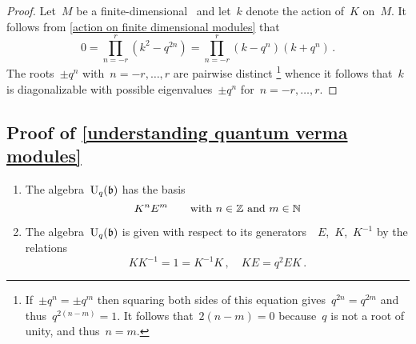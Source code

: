 \documentclass[a4paper, 11pt, oneside]{scrartcl}
\begin{document}
\begin{proof}
  Let~$M$ be a finite-dimensional~ and let~$k$ denote the action of~$K$ on~$M$.
  It follows from \cref{action on finite dimensional modules} that
  \[
    0
    =
    \prod_{n = -r}^r ( k^2 - q^{2n} )
    =
    \prod_{n = -r}^r ( k - q^n ) ( k + q^n ) \,.
  \]
  The roots~$\pm q^n$ with~$n = -r, \dotsc, r$ are pairwise distinct%
  \footnote{
    If~$\pm q^n = \pm q^m$ then squaring both sides of this equation gives~$q^{2n} = q^{2m}$ and thus~$q^{2(n-m)} = 1$.
    It follows that~$2(n-m) = 0$ because~$q$ is not a root of unity, and thus~$n = m$.
  }
  whence it follows that~$k$ is diagonalizable with possible eigenvalues~$\pm q^n$ for~$n = -r, \dotsc, r$.
\end{proof}



\subsection{Proof of \cref{understanding quantum verma modules}}
\label{proof of understanding quantum verma modules}

\begin{proposition}
  \label{quantum borel}
  \leavevmode
  \begin{enumerate}
    \item
      The algebra~$\operatorname{U}_q(\mathfrak{b})$ has the basis
      \[
        K^n E^m
        \qquad
        \text{with~$n \in \mathbb{Z}$ and~$m \in \mathbb{N}$}
      \]
    \item
      The algebra~$\operatorname{U}_q(\mathfrak{b})$ is given with respect to its generators~~$E$,~$K$,~$K^{-1}$ by the relations
      \[
        K K^{-1} = 1 = K^{-1} K \,,
        \quad
        K E = q^2 E K \,.
      \]
  \end{enumerate}
\end{proposition}
\end{document}
